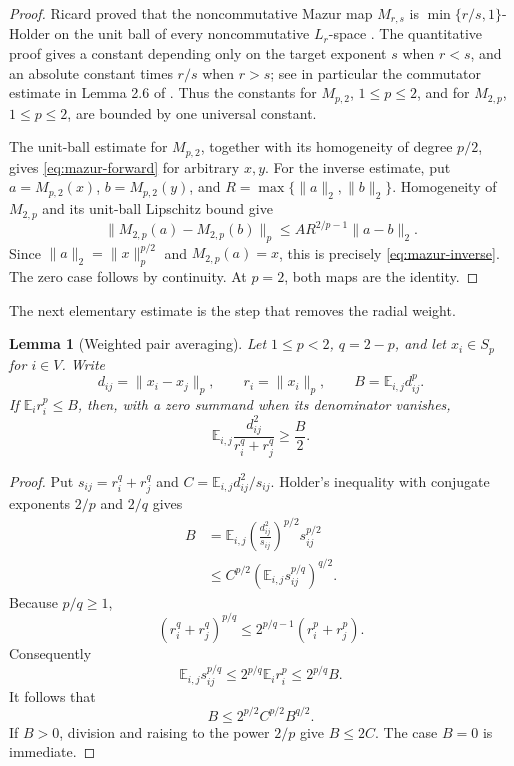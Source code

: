 \documentclass[11pt]{article}
\newtheorem{lemma}[theorem]{Lemma}
\newcommand{\E}{\mathbb E}
\begin{document}
\begin{proof}
Ricard proved that the noncommutative Mazur map $M_{r,s}$ is
$\min\{r/s,1\}$-Holder on the unit ball of every noncommutative
$L_r$-space \cite{ricard}.  The quantitative proof gives a constant
depending only on the target exponent $s$ when $r<s$, and an absolute
constant times $r/s$ when $r>s$; see in particular the commutator
estimate in Lemma 2.6 of \cite{ricard}.  Thus the constants for
$M_{p,2}$, $1\le p\le2$, and for $M_{2,p}$, $1\le p\le2$, are
bounded by one universal constant.

The unit-ball estimate for $M_{p,2}$, together with its homogeneity of
degree $p/2$, gives \eqref{eq:mazur-forward} for arbitrary $x,y$.
For the inverse estimate, put $a=M_{p,2}(x)$, $b=M_{p,2}(y)$, and
$R=\max\{\|a\|_2,\|b\|_2\}$.  Homogeneity of $M_{2,p}$ and its
unit-ball Lipschitz bound give
\[
 \|M_{2,p}(a)-M_{2,p}(b)\|_p
 \le A R^{2/p-1}\|a-b\|_2.
\]
Since $\|a\|_2=\|x\|_p^{p/2}$ and $M_{2,p}(a)=x$, this is precisely
\eqref{eq:mazur-inverse}.  The zero case follows by continuity.  At
$p=2$, both maps are the identity.
\end{proof}

The next elementary estimate is the step that removes the radial weight.

\begin{lemma}[Weighted pair averaging]\label{lem:weighted}
Let $1\le p<2$, $q=2-p$, and let $x_i\in S_p$ for $i\in V$.
Write
\[
 d_{ij}=\|x_i-x_j\|_p,\qquad r_i=\|x_i\|_p,
 \qquad B=\E_{i,j}d_{ij}^p.
\]
If $\E_i r_i^p\le B$, then, with a zero summand when its denominator
vanishes,
\[
 \E_{i,j}\frac{d_{ij}^2}{r_i^q+r_j^q}\ge\frac B2.
\]
\end{lemma}

\begin{proof}
Put $s_{ij}=r_i^q+r_j^q$ and
$C=\E_{i,j}d_{ij}^2/s_{ij}$.  Holder's inequality with conjugate
exponents $2/p$ and $2/q$ gives
\begin{align*}
 B
 &=\E_{i,j}
   \left(\frac{d_{ij}^2}{s_{ij}}\right)^{p/2}s_{ij}^{p/2}\\
 &\le C^{p/2}\left(\E_{i,j}s_{ij}^{p/q}\right)^{q/2}.
\end{align*}
Because $p/q\ge1$,
\[
 (r_i^q+r_j^q)^{p/q}
 \le2^{p/q-1}(r_i^p+r_j^p).
\]
Consequently
\[
 \E_{i,j}s_{ij}^{p/q}
 \le2^{p/q}\E_i r_i^p\le2^{p/q}B.
\]
It follows that
\[
 B\le2^{p/2}C^{p/2}B^{q/2}.
\]
If $B>0$, division and raising to the power $2/p$ give $B\le2C$.
The case $B=0$ is immediate.
\end{proof}
\end{document}
